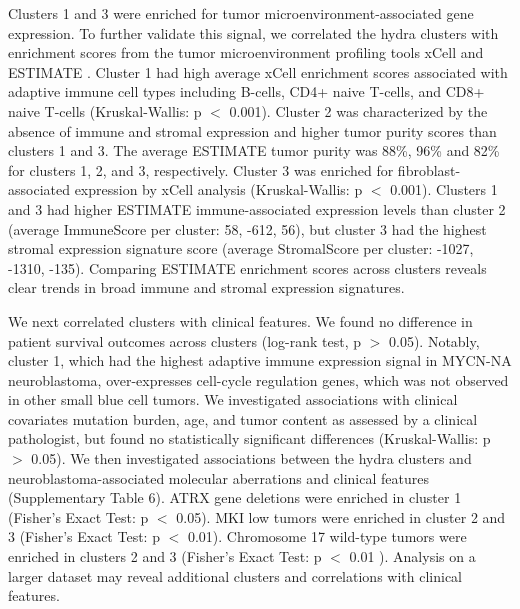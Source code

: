 \documentclass[10pt,letterpaper]{article}
\begin{document}
Clusters 1 and 3 were enriched for tumor microenvironment-associated gene expression. To further validate this signal, we correlated the hydra clusters with enrichment scores from the tumor microenvironment profiling tools xCell \cite{aranXCellDigitallyPortraying2017} and ESTIMATE \cite{yoshiharaInferringTumourPurity2013a}. Cluster 1 had high average xCell enrichment scores associated with adaptive immune cell types including B-cells, CD4+ naive T-cells, and CD8+ naive T-cells (Kruskal-Wallis: p $<$ 0.001). Cluster 2 was characterized by the absence of immune and stromal expression and higher tumor purity scores than clusters 1 and 3. The average ESTIMATE tumor purity was 88\%, 96\% and 82\% for clusters 1, 2, and 3, respectively. Cluster 3 was enriched for fibroblast-associated expression by xCell analysis (Kruskal-Wallis: p $<$ 0.001). Clusters 1 and 3 had higher ESTIMATE immune-associated expression levels than cluster 2 (average ImmuneScore per cluster: 58, -612, 56), but cluster 3 had the highest stromal expression signature score (average StromalScore per cluster: -1027, -1310, -135). Comparing ESTIMATE enrichment scores across clusters reveals clear trends in broad immune and stromal expression signatures.

We next correlated clusters with clinical features. We found no difference in patient survival outcomes across clusters (log-rank test, p $>$ 0.05). Notably, cluster 1, which had the highest adaptive immune expression signal in MYCN-NA neuroblastoma, over-expresses cell-cycle regulation genes, which was not observed in other small blue cell tumors. We investigated associations with clinical covariates mutation burden, age, and tumor content as assessed by a clinical pathologist, but found no statistically significant differences (Kruskal-Wallis: p $>$ 0.05). We then investigated associations between the hydra clusters and neuroblastoma-associated molecular aberrations and clinical features (Supplementary Table 6). ATRX gene deletions were enriched in cluster 1 (Fisher’s Exact Test: p $<$ 0.05). MKI low tumors were enriched in cluster 2 and 3 (Fisher’s Exact Test: p $<$ 0.01). Chromosome 17 wild-type tumors were enriched in clusters 2 and 3 (Fisher’s Exact Test: p $<$ 0.01 ). Analysis on a larger dataset may reveal additional clusters and correlations with clinical features.
\end{document}
